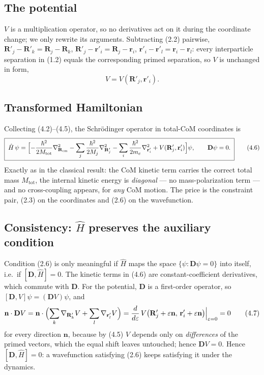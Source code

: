 \documentclass{article}
\begin{document}
\subsection{The potential}

$V$ is a multiplication operator, so no derivatives act on it during the coordinate change; we only rewrite its arguments. Subtracting (2.2) pairwise, $\mathbf{R}'_j-\mathbf{R}'_k = \mathbf{R}_j-\mathbf{R}_k$, $\mathbf{R}'_j-\mathbf{r}'_i = \mathbf{R}_j-\mathbf{r}_i$, $\mathbf{r}'_i-\mathbf{r}'_l = \mathbf{r}_i-\mathbf{r}_l$: every interparticle separation in (1.2) equals the corresponding primed separation, so $V$ is unchanged in form,
\begin{equation}
V=V(\mathbf{R}'_j,\mathbf{r}'_i). \tag{4.5}
\end{equation}

\subsection{Transformed Hamiltonian}

Collecting (4.2)--(4.5), the Schr\"odinger operator in total-CoM coordinates is
\begin{equation}
\boxed{\;\hat H\,\psi=\Bigl[-\frac{\hbar^2}{2M_{\mathrm{tot}}}\nabla^2_{\mathbf{R}_{\mathrm{cm}}}
-\sum_j\frac{\hbar^2}{2M_j}\nabla^2_{\mathbf{R}'_j}
-\sum_i\frac{\hbar^2}{2m_e}\nabla^2_{\mathbf{r}'_i}
+V(\mathbf{R}'_j,\mathbf{r}'_i)\Bigr]\psi,\qquad \mathbf{D}\psi=0.\;} \tag{4.6}
\end{equation}
Exactly as in the classical result: the CoM kinetic term carries the correct total mass $M_{\mathrm{tot}}$, the internal kinetic energy is \emph{diagonal} --- no mass-polarization term --- and no cross-coupling appears, for \emph{any} CoM motion. The price is the constraint pair, (2.3) on the coordinates and (2.6) on the wavefunction.

\subsection{Consistency: $\hat H$ preserves the auxiliary condition}

Condition (2.6) is only meaningful if $\hat H$ maps the space $\{\psi:\mathbf{D}\psi=0\}$ into itself, i.e.\ if $[\mathbf{D},\hat H]=0$. The kinetic terms in (4.6) are constant-coefficient derivatives, which commute with $\mathbf{D}$. For the potential, $\mathbf{D}$ is a first-order operator, so $[\mathbf{D},V]\psi=(\mathbf{D}V)\psi$, and
\begin{equation}
\mathbf{n}\cdot\mathbf{D}V=\mathbf{n}\cdot\Bigl(\sum_k\nabla_{\mathbf{R}'_k}V+\sum_l\nabla_{\mathbf{r}'_l}V\Bigr)=\frac{d}{d\varepsilon}\,V\bigl(\mathbf{R}'_j+\varepsilon\mathbf{n},\,\mathbf{r}'_i+\varepsilon\mathbf{n}\bigr)\Big|_{\varepsilon=0}=0 \tag{4.7}
\end{equation}
for every direction $\mathbf{n}$, because by (4.5) $V$ depends only on \emph{differences} of the primed vectors, which the equal shift leaves untouched; hence $\mathbf{D}V=0$. Hence $[\mathbf{D},\hat H]=0$: a wavefunction satisfying (2.6) keeps satisfying it under the dynamics.
\end{document}
